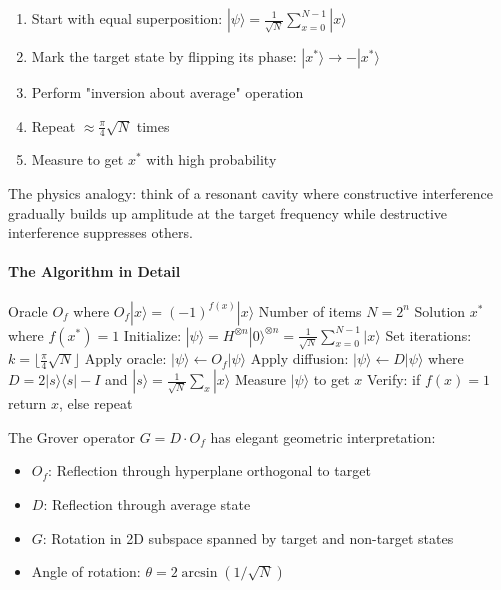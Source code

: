 \documentclass[11pt,a4paper]{article}
\begin{document}
\begin{enumerate}
    \item Start with equal superposition: $|\psi\rangle = \frac{1}{\sqrt{N}} \sum_{x=0}^{N-1} |x\rangle$
    \item Mark the target state by flipping its phase: $|x^*\rangle \to -|x^*\rangle$
    \item Perform "inversion about average" operation
    \item Repeat $\approx \frac{\pi}{4}\sqrt{N}$ times
    \item Measure to get $x^*$ with high probability
\end{enumerate}

The physics analogy: think of a resonant cavity where constructive interference gradually builds up amplitude at the target frequency while destructive interference suppresses others.

\paragraph{The Algorithm in Detail}

\begin{algorithm}
\caption{Grover's Algorithm}
\label{alg:grover}
\begin{algorithmic}[1]
\Require Oracle $O_f$ where $O_f|x\rangle = (-1)^{f(x)}|x\rangle$
\Require Number of items $N = 2^n$
\Ensure Solution $x^*$ where $f(x^*) = 1$
\State Initialize: $|\psi\rangle = H^{\otimes n}|0\rangle^{\otimes n} = \frac{1}{\sqrt{N}} \sum_{x=0}^{N-1} |x\rangle$
\State Set iterations: $k = \lfloor \frac{\pi}{4}\sqrt{N} \rfloor$
    \State Apply oracle: $|\psi\rangle \gets O_f|\psi\rangle$ 
    \State Apply diffusion: $|\psi\rangle \gets D|\psi\rangle$ 
    \State \quad where $D = 2|s\rangle\langle s| - I$ and $|s\rangle = \frac{1}{\sqrt{N}}\sum_x|x\rangle$
\EndFor
\State Measure $|\psi\rangle$ to get $x$
\State Verify: if $f(x) = 1$ return $x$, else repeat
\end{algorithmic}
\end{algorithm}

The Grover operator $G = D \cdot O_f$ has elegant geometric interpretation:

\begin{itemize}
    \item $O_f$: Reflection through hyperplane orthogonal to target
    \item $D$: Reflection through average state
    \item $G$: Rotation in 2D subspace spanned by target and non-target states
    \item Angle of rotation: $\theta = 2\arcsin(1/\sqrt{N})$
\end{itemize}
\end{document}
